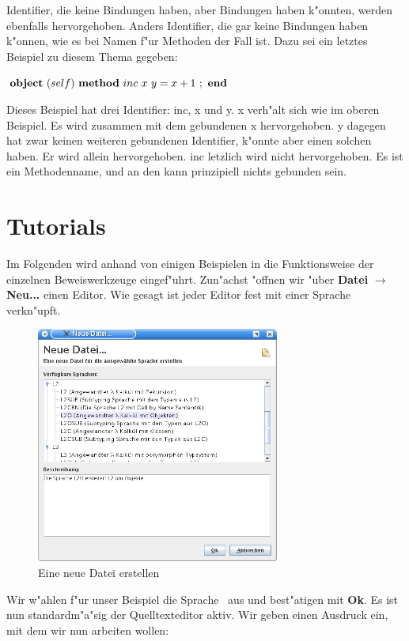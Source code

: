 Identifier, die keine Bindungen haben, aber Bindungen haben k"onnten, werden ebenfalls hervorgehoben. 
Anders Identifier, die gar keine Bindungen haben k"onnen, wie es bei Namen f"ur Methoden der Fall ist. 
Dazu sei ein letztes Beispiel zu diesem Thema gegeben:

$\object{self}{\curriedmethodtwo{inc}{x}{y}{\infix{+}{x}{1}}}$

Dieses Beispiel hat drei Identifier: inc, x und y. x verh"alt sich wie im oberen Beispiel. 
Es wird zusammen mit dem gebundenen x hervorgehoben. y dagegen hat zwar keinen weiteren gebundenen Identifier, 
k"onnte aber einen solchen haben. Er wird allein hervorgehoben. inc letzlich wird nicht hervorgehoben. 
Es ist ein Methodenname, und an den kann prinzipiell nichts gebunden sein.

\section {Tutorials}
Im Folgenden wird anhand von einigen Beispielen in die
Funktionsweise der einzelnen Beweiswerkzeuge eingef"uhrt. Zun"achst
"offnen wir "uber {\bf Datei} $\rightarrow$ {\bf Neu...} einen
Editor. Wie gesagt ist jeder Editor fest mit einer Sprache
verkn"upft.

\begin{figure}[h]
\begin{center}
\includegraphics[width=8cm]{images/new-dialog.png}
\caption{Eine neue Datei erstellen}
\end{center}
\end{figure}

Wir w"ahlen f"ur unser Beispiel die Sprache \LONE\ aus und best"atigen
mit {\bf Ok}. Es ist nun standardm"a"sig der Quelltexteditor aktiv.
Wir geben einen Ausdruck ein, mit dem wir nun arbeiten wollen:

